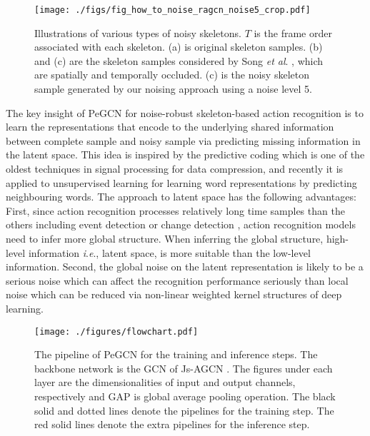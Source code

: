 \documentclass[runningheads]{llncs}
\newcommand{\etal}{\textit{et al}. }
\newcommand{\ie}{\textit{i}.\textit{e}., }
\begin{document}
\begin{figure*}[t]
\centering
\texttt{[image: ./figs/fig\_how\_to\_noise\_ragcn\_noise5\_crop.pdf]}
\caption{Illustrations of various types of noisy skeletons. $T$ is the frame order associated with each skeleton.
 (a) is original skeleton samples. (b) and (c) are the skeleton samples considered by Song \etal \cite{song2019richly}, which are spatially and temporally occluded. (c) is the noisy skeleton sample generated by our noising approach using a noise level 5.}
\label{fig:noise_typ}
\vspace{-4ex}
\end{figure*}

The key insight of PeGCN for noise-robust skeleton-based action recognition is to learn the representations that encode to the underlying shared information between complete sample and noisy sample via predicting missing information in the latent space. This idea is inspired by the predictive coding \cite{1055126,atal1970adaptive,oord2018representation} which is one of the oldest techniques in signal processing for data compression, and recently it is applied to unsupervised learning for learning word representations \cite{mikolov2013efficient} by predicting neighbouring words. The approach to latent space has the following advantages: First, since action recognition processes relatively long time samples than the others including event detection \cite{yu2018joint,8580568} or change detection \cite{hussain2013change}, action recognition models need to infer more global structure. When inferring the global structure, high-level information \ie latent space, is more suitable than the low-level information. Second, the global noise on the latent representation is likely to be a serious noise which can affect the recognition performance seriously than local noise which can be reduced via non-linear weighted kernel structures of deep learning.

\begin{figure*}[t]
	\vspace{-0.2cm}
	\begin{center}
		\centerline{\texttt{[image: ./figures/flowchart.pdf]}}
		\caption{The pipeline of PeGCN for the training and inference steps. The backbone network is the GCN of Js-AGCN \cite{shi2019two}. The figures under each layer are the dimensionalities of input and output channels, respectively and GAP is global average pooling operation. The black solid and dotted lines denote the pipelines for the training step. The red solid lines denote the extra pipelines for the inference step.}
		\label{fig:1}
	\end{center}
	\vspace{-8ex}
\end{figure*}
\end{document}
